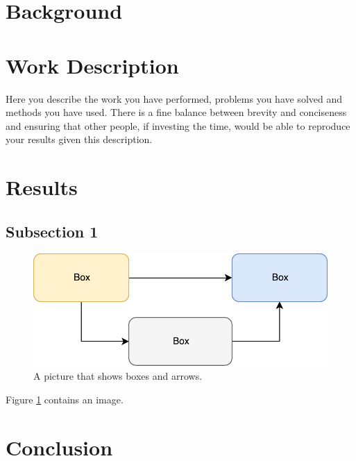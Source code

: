 \documentclass{llncs}
\begin{document}
\section{Background}\label{sec:background}

\section{Work Description}
Here you describe the work you have performed, problems you have solved and methods you have used. There is a fine balance between brevity and conciseness and ensuring that other people, if investing the time, would be able to reproduce your results given this description.



\section{Results}

\subsection{Subsection 1}
\begin{figure}[t!]
	\centering
	\includegraphics[width=.99\linewidth]{images/examplepicture}
	\caption{A picture that shows boxes and arrows.}
	\label{fig:examplepicture}
\end{figure}


Figure \ref{fig:examplepicture} contains an image.

\section{Conclusion}


%

\end{document}
